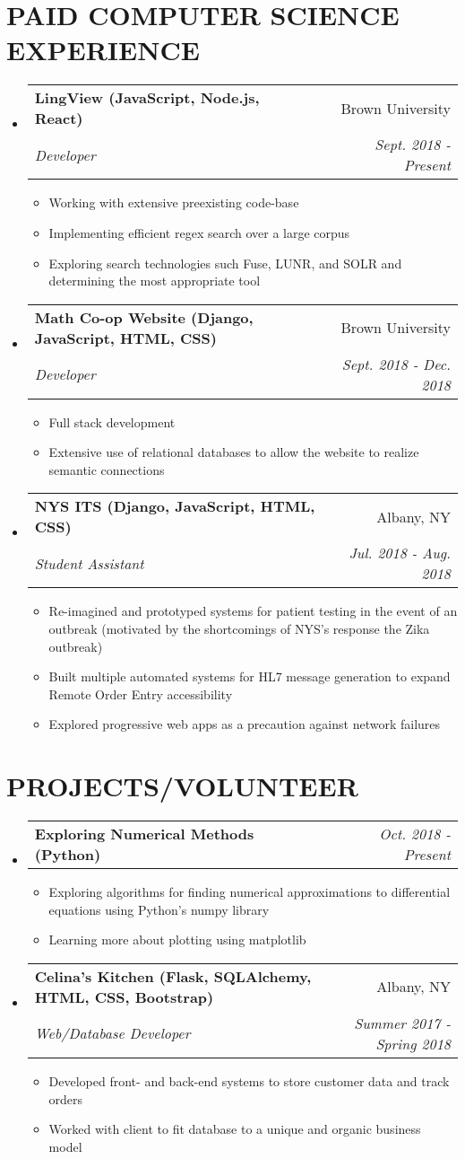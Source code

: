 \documentclass[letterpaper,11pt]{article}
\makeatletter
\newcommand{\resumeItem}[2]{
  \item\small{
    \textbf{#1}{#2 \vspace{-2pt}}
  }
}
\newcommand{\resumeSubheading}[4]{
  \vspace{-1pt}\item
    \begin{tabular*}{0.97\textwidth}{l@{\extracolsep{\fill}}r}
      \textbf{#1} & #2 \\
      \textit{\small#3} & \textit{\small #4} \\
    \end{tabular*}\vspace{-5pt}
}
\newcommand{\resumeSubheadingSimple}[2]{
  \vspace{-1pt}\item
    \begin{tabular*}{0.97\textwidth}{l@{\extracolsep{\fill}}r}
      \textbf{#1} & \textit{\small#2}\\
    \end{tabular*}\vspace{-5pt}
}
\newcommand{\resumeSubHeadingListStart}{\begin{itemize}[leftmargin=*]}
\newcommand{\resumeSubHeadingListEnd}{\end{itemize}}
\newcommand{\resumeItemListStart}{\begin{itemize}}
\newcommand{\resumeItemListEnd}{\end{itemize}\vspace{-5pt}}
\makeatother
\begin{document}
\section{PAID COMPUTER SCIENCE EXPERIENCE}
  \resumeSubHeadingListStart
    \resumeSubheading{LingView (JavaScript, Node.js, React)}{Brown University}{Developer}{Sept. 2018 - Present}
      \resumeItemListStart
        \resumeItem{}
        {Working with extensive preexisting code-base}
        \resumeItem{}
        {Implementing efficient regex search over a large corpus}
        \resumeItem{}
        {Exploring search technologies such Fuse, LUNR, and SOLR and determining the most appropriate tool}
      \resumeItemListEnd
    \resumeSubheading{Math Co-op Website (Django, JavaScript, HTML, CSS)}{Brown University}{Developer}{Sept. 2018 - Dec. 2018}
      \resumeItemListStart
        \resumeItem{}
        {Full stack development}
        \resumeItem{}
        {Extensive use of relational databases to allow the website to realize semantic connections}
      \resumeItemListEnd
    \resumeSubheading{NYS ITS (Django, JavaScript, HTML, CSS)}{Albany, NY}{Student Assistant}{Jul. 2018 - Aug. 2018}
      \resumeItemListStart
        \resumeItem{}
        {Re-imagined and prototyped systems for patient testing in the event of an outbreak (motivated by the shortcomings of NYS's response the Zika outbreak)}
        \resumeItem{}
        {Built multiple automated systems for HL7 message generation to expand Remote Order Entry accessibility}
        \resumeItem{}
        {Explored progressive web apps as a precaution against network failures}
      \resumeItemListEnd
  \resumeSubHeadingListEnd

\section{PROJECTS/VOLUNTEER}
    \resumeSubHeadingListStart
        \resumeSubheadingSimple
          {Exploring Numerical Methods (Python)}{Oct. 2018 - Present}
          \resumeItemListStart
            \resumeItem{}
              {Exploring algorithms for finding numerical approximations to differential equations using Python's numpy library}
            \resumeItem{}
              {Learning more about plotting using matplotlib}
          \resumeItemListEnd
        \resumeSubheading
          {Celina's Kitchen (Flask, SQLAlchemy, HTML, CSS, Bootstrap)}{Albany, NY}
          {Web/Database Developer}{Summer 2017 - Spring 2018}
          \resumeItemListStart
            \resumeItem{}
              {Developed front- and back-end systems to store customer data and track orders}
            \resumeItem{}
              {Worked with client to fit database to a unique and organic business model}
          \resumeItemListEnd
    \resumeSubHeadingListEnd
\end{document}
